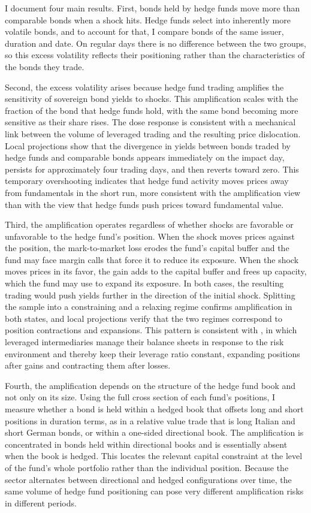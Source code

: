 \documentclass[english, 11pt, oneside]{article}
\begin{document}
I document four main results. First, bonds held by hedge funds move more than comparable bonds when a shock hits. Hedge funds select into inherently more volatile bonds, and to account for that, I compare bonds of the same issuer, duration and date. On regular days there is no difference between the two groups, so this excess volatility reflects their positioning rather than the characteristics of the bonds they trade.

Second, the excess volatility arises because hedge fund trading amplifies the sensitivity of sovereign bond yields to shocks. This amplification scales with the fraction of the bond that hedge funds hold, with the same bond becoming more sensitive as their share rises. The dose response is consistent with a mechanical link between the volume of leveraged trading and the resulting price dislocation. Local projections show that the divergence in yields between bonds traded by hedge funds and comparable bonds appears immediately on the impact day, persists for approximately four trading days, and then reverts toward zero. This temporary overshooting indicates that hedge fund activity moves prices away from fundamentals in the short run, more consistent with the amplification view than with the view that hedge funds push prices toward fundamental value.

Third, the amplification operates regardless of whether shocks are favorable or unfavorable to the hedge fund's position. When the shock moves prices against the position, the mark-to-market loss erodes the fund's capital buffer and the fund may face margin calls that force it to reduce its exposure. When the shock moves prices in its favor, the gain adds to the capital buffer and frees up capacity, which the fund may use to expand its exposure. In both cases, the resulting trading would push yields further in the direction of the initial shock. Splitting the sample into a constraining and a relaxing regime confirms amplification in both states, and local projections verify that the two regimes correspond to position contractions and expansions. This pattern is consistent with \citet{adrian2014}, in which leveraged intermediaries manage their balance sheets in response to the risk environment and thereby keep their leverage ratio constant, expanding positions after gains and contracting them after losses.

Fourth, the amplification depends on the structure of the hedge fund book and not only on its size. Using the full cross section of each fund's positions, I measure whether a bond is held within a hedged book that offsets long and short positions in duration terms, as in a relative value trade that is long Italian and short German bonds, or within a one-sided directional book. The amplification is concentrated in bonds held within directional books and is essentially absent when the book is hedged. This locates the relevant capital constraint at the level of the fund's whole portfolio rather than the individual position. Because the sector alternates between directional and hedged configurations over time, the same volume of hedge fund positioning can pose very different amplification risks in different periods.
\end{document}
